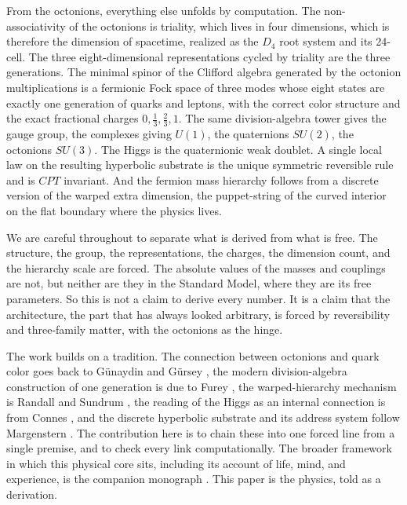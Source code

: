 From the octonions, everything else unfolds by computation. The non-associativity of the octonions is triality, which
lives in four dimensions, which is therefore the dimension of spacetime, realized as the $D_4$ root system and its
24-cell. The three eight-dimensional representations cycled by triality are the three generations. The minimal spinor
of the Clifford algebra generated by the octonion multiplications is a fermionic Fock space of three modes whose eight
states are exactly one generation of quarks and leptons, with the correct color structure and the exact fractional
charges $0, \tfrac13, \tfrac23, 1$. The same division-algebra tower gives the gauge group, the complexes giving
$U(1)$, the quaternions $SU(2)$, the octonions $SU(3)$. The Higgs is the quaternionic weak doublet. A single local law
on the resulting hyperbolic substrate is the unique symmetric reversible rule and is $CPT$ invariant. And the fermion
mass hierarchy follows from a discrete version of the warped extra dimension, the puppet-string of the curved interior
on the flat boundary where the physics lives.

We are careful throughout to separate what is derived from what is free. The structure, the group, the
representations, the charges, the dimension count, and the hierarchy scale are forced. The absolute values of the
masses and couplings are not, but neither are they in the Standard Model, where they are its free parameters. So this
is not a claim to derive every number. It is a claim that the architecture, the part that has always looked arbitrary,
is forced by reversibility and three-family matter, with the octonions as the hinge.

The work builds on a tradition. The connection between octonions and quark color goes back to G{\"u}naydin and Gürsey
\cite{gunaydin1973}, the modern division-algebra construction of one generation is due to Furey \cite{furey2018}, the
warped-hierarchy mechanism is Randall and Sundrum \cite{randall1999}, the reading of the Higgs as an internal
connection is from Connes \cite{connes1996}, and the discrete hyperbolic substrate and its address system follow
Margenstern \cite{margenstern2007vol1, margenstern2008vol2}. The contribution here is to chain these into one forced
line from a single premise, and to check every link computationally. The broader framework in which this physical core
sits, including its account of life, mind, and experience, is the companion monograph \cite{pollard2026vibe}. This
paper is the physics, told as a derivation.
